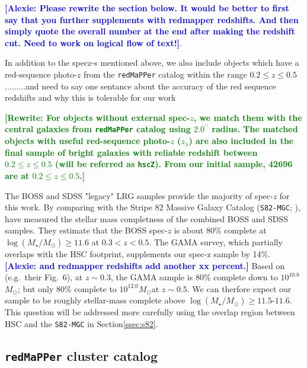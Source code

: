 \documentclass{emulateapj}
\def\arcsec{{\prime\prime}}
\def\msun{$M_\odot$}
\def\redm{\texttt{redMaPPer}}
\def\logms{{$\log (M_{\star}/M_{\odot})$}}
\newcommand{\alexie}[1]{\textcolor{blue}{\textbf{[Alexie: #1]}}}
\newcommand{\rewrite}[1]{\textcolor{green}{\textbf{[Rewrite: #1]}}}
\begin{document}
\begin{CJK*}{UTF8}{gbsn}
        
        \alexie{Please rewrite the section below. It would be better to first say that you further supplements with redmapper redshifts. And then simply quote the overall number at the end after making the redshift cut. Need to work on logical flow of text!}.
        
  In addition to the specz-s mentioned above, we also include objects which have a red-sequence photo-$z$ from the \redm{} catalog within the range $0.2 \leq z \leq 0.5$ .........and need to say one sentance about the accuracy of the red sequence redshifts and why this is tolerable for our work
   
    \rewrite{For objects without external spec-$z$, we match them with the central galaxies 
    from \redm{} catalog using $2.0^{\arcsec}$ radius. 
    The matched objects with useful red-sequence photo-$z$ ($z_{\lambda}$) are also 
    included in the final sample of bright galaxies with reliable redshift between 
    $0.2 \leq z \leq 0.5$
    (will be referred as \texttt{hscZ}).   From our initial sample, 42696 are at $0.2 \leq z \leq 0.5$.}
        
    The BOSS and SDSS "legacy" LRG samples provide the majority of spec-$z$ for this work. By comparing with the Stripe 82 Massive Galaxy Catalog
    (\texttt{S82-MGC}; \citealt{Bundy2015}), \citet{Leauthaud2016} have measured the stellar mass completness of the combined BOSS and SDSS samples. They estimate that the BOSS spec-$z$ is about 80\% complete at \logms{}$\geq 11.6$ at $0.3 < z < 0.5$. The GAMA survey, which partially overlaps with the HSC footprint, supplements our spec-z sample by 14\%. \alexie{and redmapper redshifts add another xx percent.} Based on \citet{Taylor2011} (e.g.\ their Fig.~6), at $z\sim 0.3$, the GAMA 
    sample is 80\% complete down to $10^{10.8}$\msun; but only 80\% complete to 
    $10^{12.0}$\msun at $z\sim 0.5$. We can therfore expect our sample to be roughly stellar-mass complete above \logms{}$\geq 11.5$-$11.6$. This question will be addressed more carefully using the overlap region between HSC and the \texttt{S82-MGC} in Section\ref{ssec:s82}.


\subsection{\redm{}{} cluster catalog}
    \label{ssec:redmapper}
    

\end{CJK*}
\end{document}
